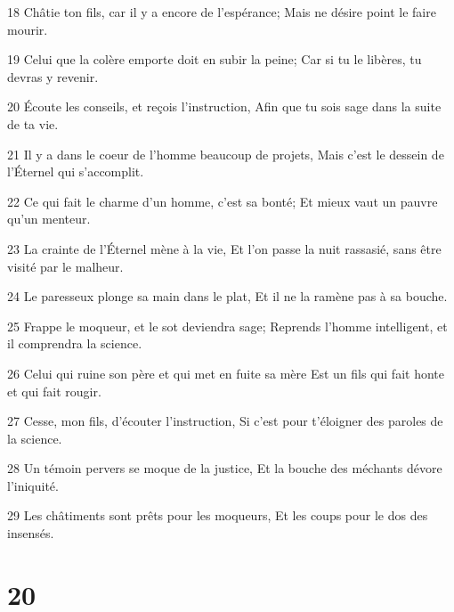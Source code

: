 \par 18 Châtie ton fils, car il y a encore de l'espérance; Mais ne désire point le faire mourir.
\par 19 Celui que la colère emporte doit en subir la peine; Car si tu le libères, tu devras y revenir.
\par 20 Écoute les conseils, et reçois l'instruction, Afin que tu sois sage dans la suite de ta vie.
\par 21 Il y a dans le coeur de l'homme beaucoup de projets, Mais c'est le dessein de l'Éternel qui s'accomplit.
\par 22 Ce qui fait le charme d'un homme, c'est sa bonté; Et mieux vaut un pauvre qu'un menteur.
\par 23 La crainte de l'Éternel mène à la vie, Et l'on passe la nuit rassasié, sans être visité par le malheur.
\par 24 Le paresseux plonge sa main dans le plat, Et il ne la ramène pas à sa bouche.
\par 25 Frappe le moqueur, et le sot deviendra sage; Reprends l'homme intelligent, et il comprendra la science.
\par 26 Celui qui ruine son père et qui met en fuite sa mère Est un fils qui fait honte et qui fait rougir.
\par 27 Cesse, mon fils, d'écouter l'instruction, Si c'est pour t'éloigner des paroles de la science.
\par 28 Un témoin pervers se moque de la justice, Et la bouche des méchants dévore l'iniquité.
\par 29 Les châtiments sont prêts pour les moqueurs, Et les coups pour le dos des insensés.

\chapter{20}

